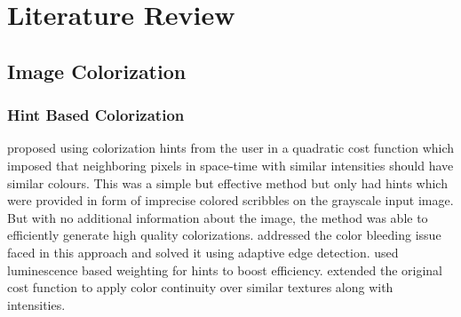 \documentclass{article} %
\begin{document}
\section{Literature Review}
\subsection{Image Colorization}
\subsubsection{Hint Based Colorization}
\hspace*{0.25 in}\citet{levin2004colorization} proposed using colorization hints from the user in a quadratic cost function which imposed that neighboring pixels in space-time with similar intensities should have similar colours. This was a simple but effective method but only had hints which were provided in form of imprecise colored scribbles on the grayscale input image. But with no additional information about the image, the method was able to efficiently generate high quality colorizations. \cite{huang2005edge} addressed the color bleeding issue faced in this approach and solved it using adaptive edge detection. \cite{yatziv2006chrominance} used luminescence based weighting for hints to boost efficiency. \cite{qu2006manga} extended the original cost function to apply color continuity over similar textures along with intensities.
\end{document}
